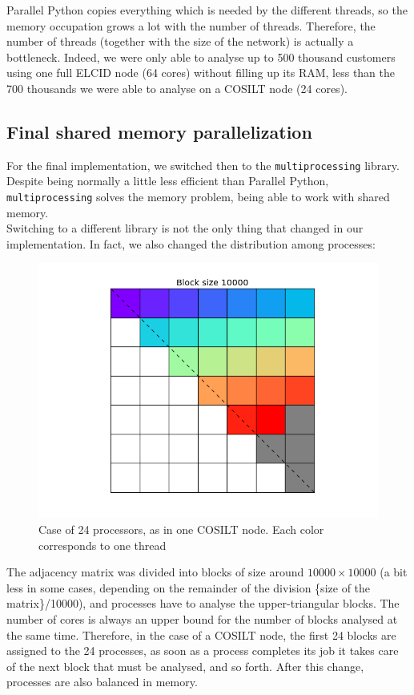 \documentclass[a4paper,11pt]{book}
\begin{document}
Parallel Python copies everything which is needed by the different threads,
so the memory occupation grows a lot with the number of threads.
Therefore, the number of threads (together with the size of the network) is
actually a bottleneck. Indeed, we were only able to analyse up to 500 thousand customers using one full ELCID node (64 cores) without filling up its RAM, less than the 700 thousands we were able to analyse on a COSILT node (24 cores).\\
\subsection{Final shared memory parallelization}
For the final implementation, we switched then to the \lstinline!multiprocessing! library. Despite being normally a little less efficient than Parallel Python,
\lstinline!multiprocessing! solves the memory problem, being able to work with
shared memory.\\

Switching to a different library is not the only thing that changed in our implementation. In fact, we also changed the distribution among processes:
\begin{figure}[H]\label{fig:blocks}
\centering
\includegraphics[height=8.415 cm,width=11.25 cm]{grid.png}
\caption{Case of 24 processors, as in one COSILT node. Each color corresponds to one thread}
\end{figure}
The adjacency matrix was divided into blocks of size around $10000\times 10000$ (a bit less in some cases, depending on the remainder of the division \{size of the matrix\}/10000), and processes have to analyse the upper-triangular blocks. The number of cores is always an upper bound for the number of blocks analysed at the same time. Therefore, in the case of a COSILT node, the first 24 blocks are assigned to the 24 processes, as soon as a process completes its job it takes care of the next block that must be analysed, and so forth. After this change, processes are also balanced in memory.\\
\end{document}

